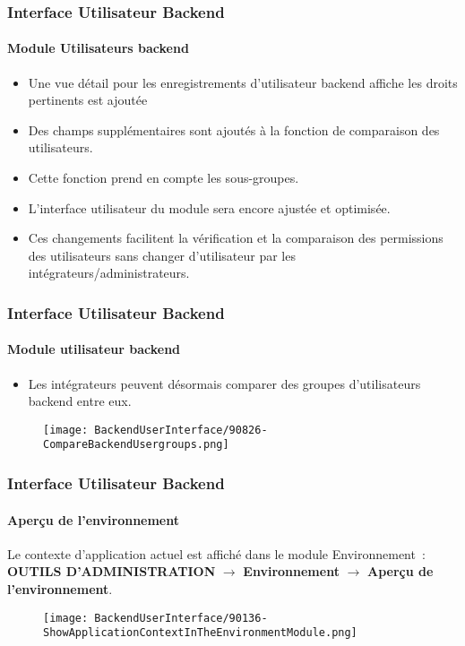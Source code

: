 
\begin{frame}[fragile]
	\frametitle{Interface Utilisateur Backend}
	\framesubtitle{Module Utilisateurs backend}

	\begin{itemize}
		\item Une vue détail pour les enregistrements d'utilisateur backend affiche les droits pertinents est ajoutée
		\item Des champs supplémentaires sont ajoutés à la fonction de comparaison des utilisateurs.
		\item Cette fonction prend en compte les sous-groupes.
		\item L'interface utilisateur du module sera encore ajustée et optimisée.
		\item Ces changements facilitent la vérification et la comparaison des permissions des
			utilisateurs sans changer d'utilisateur par les intégrateurs/administrateurs.
	\end{itemize}

\end{frame}


\begin{frame}[fragile]
	\frametitle{Interface Utilisateur Backend}
	\framesubtitle{Module utilisateur backend}

	\begin{itemize}
		\item Les intégrateurs peuvent désormais comparer des groupes d'utilisateurs backend entre eux.
	\end{itemize}

	\begin{figure}
		\texttt{[image: BackendUserInterface/90826-CompareBackendUsergroups.png]}
	\end{figure}

\end{frame}


\begin{frame}[fragile]
	\frametitle{Interface Utilisateur Backend}
	\framesubtitle{Aperçu de l'environnement}

	Le contexte d'application actuel est affiché dans le module Environnement~:\newline
	\textbf{OUTILS D'ADMINISTRATION} $\rightarrow$ \textbf{Environnement} $\rightarrow$ \textbf{Aperçu de l'environnement}.

	\begin{figure}
		\texttt{[image: BackendUserInterface/90136-ShowApplicationContextInTheEnvironmentModule.png]}
	\end{figure}

\end{frame}

